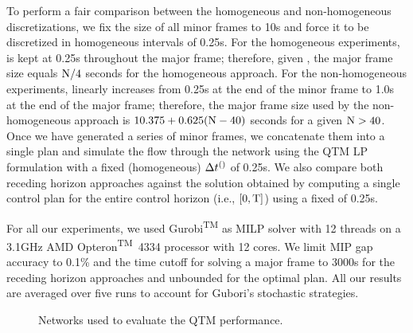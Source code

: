 To perform a fair comparison between the homogeneous and non-homogeneous
discretizations, we fix the size of all minor frames to 10s and force it to be
discretized in homogeneous intervals of 0.25s.
%
For the homogeneous experiments, \DT[] is kept at 0.25s throughout the major
frame; therefore, given \Nn, the major frame size equals $\Nn/4$ seconds for the
homogeneous approach.
%
For the non-homogeneous experiments, \DT[] linearly increases from
0.25s at the end of the minor frame to 1.0s at the end of the major frame;
therefore, the major frame size used by the non-homogeneous approach
is $10.375 + 0.625(\Nn-40)$ seconds for a given $\Nn > 40$.
%
%
Once we have generated a series of minor frames, we concatenate them into a
single plan and simulate the flow through the network using the QTM LP
formulation with a fixed (homogeneous) $\DT[]$ of 0.25s.
%
%
We also compare both receding horizon approaches against the
 solution obtained by computing a single control plan
for the entire control horizon (i.e., $[0,\TMAX]$) using a fixed \DT[] of 0.25s.


For all our experiments, we used Gurobi\textsuperscript{TM} as MILP solver with
12 threads on a 3.1GHz AMD Opteron\textsuperscript{TM}~4334 processor with 12
cores.
%
We limit MIP gap accuracy to 0.1\% and the time cutoff for solving a major frame
to 3000s for the receding horizon approaches and unbounded for the optimal plan.
%
%
All our results are averaged over five runs to account for Gubori's
stochastic strategies.




\begin{figure*}[t!]
\centering
\caption{Networks used to evaluate the QTM performance. }
\label{fig:networks}
\end{figure*}




